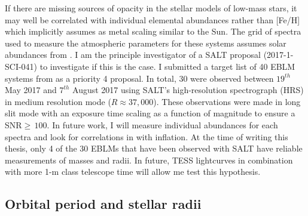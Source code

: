 If there are missing sources of opacity in the stellar models of low-mass stars, it may well be correlated with individual elemental abundances rather than [Fe/H] which implicitly assumes as metal scaling similar to the Sun. The grid of spectra used to measure the atmospheric parameters for these systems assumes solar abundances from \citet{2009ARA&A..47..481A}. I am the principle investigator of a SALT proposal (2017-1-SCI-041) to investigate if this is the case. I submitted a target list of 40 EBLM systems from \citet{Triaud2017} as a priority 4 proposal. In total, 30 were observed between $19^{th}$ May 2017 and $7^{th}$ August 2017 using SALT's high-resolution spectrograph (HRS) in medium resolution mode ($R \approx 37,000$). These observations were made in long slit mode with an exposure time scaling as a function of magnitude to ensure a SNR$\geq \, 100$. In future work, I will measure individual abundances for each spectra and look for correlations in with inflation. At the time of writing this thesis, only 4 of the 30 EBLMs that have been observed with SALT have reliable measurements of masses and radii. In future, TESS lightcurves in combination with more 1-m class telescope time will allow me test  this hypothesis.


\subsection{Orbital period and stellar radii}


